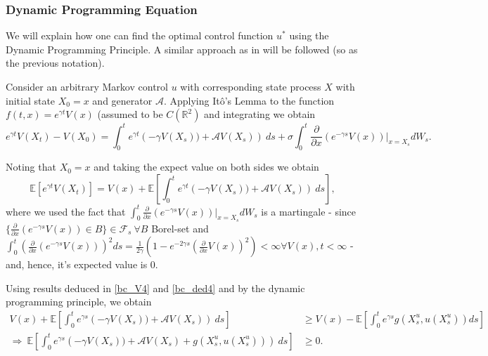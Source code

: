 \subsubsection{Dynamic Programming Equation}

We will explain how one can find the optimal control function $u^*$ using the Dynamic Programming Principle. A similar approach as in \cite{ross} will be followed (so as the previous notation).

Consider an arbitrary Markov control $u$ with corresponding state process $X$ with initial state $X_0=x$ and generator $\mathcal{A}$. Applying Itô's Lemma to the function $f(t,x)=e^{\gamma t}V(x)$ (assumed to be $C(\mathds{R}^2)$ and integrating we obtain
\begin{equation}
e^{\gamma t}V(X_t)-V(X_0)=\int^t_0  e^{\gamma t} \left( - \gamma V(X_s))+\mathcal{A}V(X_s)\right) \ ds + \sigma \int^t_0 \frac{\partial}{\partial x}(e^{-\gamma s}V(x))\bigg\rvert_{x=X_s} dW_s.
\label{bc_dpe1}
\end{equation}

Noting that $X_0=x$ and taking the expect value on both sides we obtain
\begin{equation}
\mathds{E} \left[  e^{\gamma t}V(X_t) \right]=V(x) + \mathds{E} \left[ \int^t_0  e^{\gamma t} \left( - \gamma V(X_s))+\mathcal{A}V(X_s)\right) \ ds \right],
\label{bc_ded4}
\end{equation}
where we used the fact that $\int^t_0 \frac{\partial}{\partial x}(e^{-\gamma s}V(x))\bigg\rvert_{x=X_s} dW_s$ is a martingale - since $\{ \frac{\partial}{\partial x}(e^{-\gamma s}V(x)) \in B \} \in \mathcal{F}_s \ \forall B$ Borel-set and 
$\int^t_0 \left( \frac{\partial}{\partial x}(e^{-\gamma s}V(x)) \right)^2  ds
=\frac{1}{2\gamma}\left( 1 - e^{-2\gamma s} \left(\frac{\partial}{\partial x}V(x)\right)^2 \right)<\infty \forall V(x),t<\infty$ - and, hence, it's expected value is 0.

Using results deduced in \eqref{bc_V4} and \ref{bc_ded4} and by the dynamic programming principle, we obtain
\begin{align}
V(x)+\mathds{E} \left[ \int^t_0  e^{\gamma s} \left( - \gamma V(X_s))+\mathcal{A}V(X_s)\right) \ ds \right] &\geq V(x) - \mathds{E} \left[ \int^t_0  e^{\gamma s} g(X_s^u,u(X_s^u)) ds \right] \nonumber \\ 
\Rightarrow \ \mathds{E} \left[ \int^t_0  e^{\gamma s} \left( - \gamma V(X_s))+\mathcal{A}V(X_s)+g(X_s^u,u(X_s^u))\right) \ ds \right] &\geq 0.
\label{bc_ded5}
\end{align}


